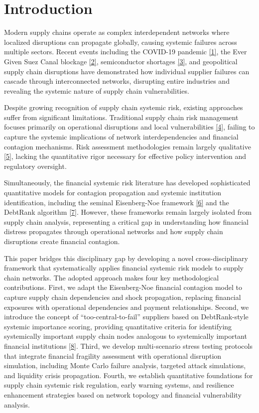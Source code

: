 \documentclass[a4 paper, 11pt,twoside]{article}
\newcommand{\0}{\Bf{0}}
\theoremstyle{definition}
\begin{document}
\section{Introduction}

Modern supply chains operate as complex interdependent networks where localized disruptions can propagate globally, causing systemic failures across multiple sectors. Recent events including the COVID-19 pandemic \hyperref[ref1]{[1]}, the Ever Given Suez Canal blockage \hyperref[ref2]{[2]}, semiconductor shortages \hyperref[ref3]{[3]}, and geopolitical supply chain disruptions have demonstrated how individual supplier failures can cascade through interconnected networks, disrupting entire industries and revealing the systemic nature of supply chain vulnerabilities.

Despite growing recognition of supply chain systemic risk, existing approaches suffer from significant limitations. Traditional supply chain risk management focuses primarily on operational disruptions and local vulnerabilities \hyperref[ref4]{[4]}, failing to capture the systemic implications of network interdependencies and financial contagion mechanisms. Risk assessment methodologies remain largely qualitative \hyperref[ref5]{[5]}, lacking the quantitative rigor necessary for effective policy intervention and regulatory oversight.

Simultaneously, the financial systemic risk literature has developed sophisticated quantitative models for contagion propagation and systemic institution identification, including the seminal Eisenberg-Noe framework \hyperref[ref6]{[6]} and the DebtRank algorithm \hyperref[ref7]{[7]}. However, these frameworks remain largely isolated from supply chain analysis, representing a critical gap in understanding how financial distress propagates through operational networks and how supply chain disruptions create financial contagion.

This paper bridges this disciplinary gap by developing a novel cross-disciplinary framework that systematically applies financial systemic risk models to supply chain networks. The adopted approach makes four key methodological contributions. First, we adapt the Eisenberg-Noe financial contagion model to capture supply chain dependencies and shock propagation, replacing financial exposures with operational dependencies and payment relationships. Second, we introduce the concept of ``too-central-to-fail'' suppliers based on DebtRank-style systemic importance scoring, providing quantitative criteria for identifying systemically important supply chain nodes analogous to systemically important financial institutions \hyperref[ref8]{[8]}. Third, we develop multi-scenario stress testing protocols that integrate financial fragility assessment with operational disruption simulation, including Monte Carlo failure analysis, targeted attack simulations, and liquidity crisis propagation. Fourth, we establish quantitative foundations for supply chain systemic risk regulation, early warning systems, and resilience enhancement strategies based on network topology and financial vulnerability analysis.
\end{document}
